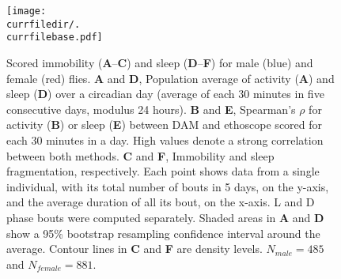 \begin{figure}[h!]
	\centering   
	\texttt{[image: \\currfiledir/.\\currfilebase.pdf]}
	  \caption[Comparison to DAM]{
	Scored immobility (\textbf{A}--\textbf{C}) and sleep (\textbf{D}--\textbf{F}) for male (blue) and female (red) flies.
	\textbf{A} and \textbf{D}, Population average of activity (\textbf{A}) and sleep (\textbf{D}) over a circadian day (average of each 30 minutes in five consecutive days, modulus 24 hours).
	\textbf{B} and \textbf{E}, Spearman's $\rho$ for activity (\textbf{B}) or sleep (\textbf{E}) between DAM and ethoscope scored for each 30 minutes in a day. 
	High values denote a strong correlation between both methods.
	\textbf{C} and \textbf{F}, Immobility and sleep fragmentation, respectively.
	Each point shows data from a single individual, with its total number of bouts in 5 days, on the y-axis, and the average duration of all its bout, on the x-axis. 
	L  and D phase bouts were computed separately.
	Shaded areas in \textbf{A} and \textbf{D} show a 95\% bootstrap resampling confidence interval around the average. 
	Contour lines in \textbf{C} and \textbf{F} are density levels. 
	$N_{male} = 485$ and $N_{female} = 881$.
	\label{fig:\currfilebase}
}
\end{figure}
